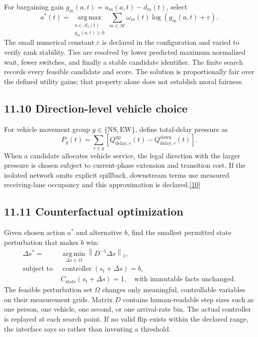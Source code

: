 \documentclass[
  english,
  11pt,
  a4paper,
]{article}
\begin{document}
For bargaining gain \(g_m(a,t)=u_m(a,t)-d_m(t)\), select
\[
  a^*(t)=\operatorname*{arg\,max}_{\substack{
      a\in\mathcal{A}_{\delta}(t)\\ g_m(a,t)\ge0}}
    \sum_{m\in\mathcal{M}}\omega_m(t)
    \log\!\left(g_m(a,t)+\varepsilon\right).
\]
The small numerical constant \(\varepsilon\) is declared in the
configuration and varied to verify rank stability. Ties are resolved by
lower predicted maximum normalized wait, fewer switches, and finally a
stable candidate identifier. The finite search records every feasible
candidate and score. The solution is proportionally fair over the
defined utility gains; that property alone does not establish moral
fairness.

\subsection{11.10 Direction-level vehicle choice}\label{direction-level-vehicle-choice}

For vehicle movement group \(g\in\{\mathrm{NS},\mathrm{EW}\}\), define
total-delay pressure as
\[
  P_g(t)=\sum_{r\in g}
  \left[Q^{\mathrm{up}}_{\mathrm{delay},r}(t)
  -Q^{\mathrm{down}}_{\mathrm{delay},r}(t)\right].
\]
When a candidate allocates vehicle service, the legal direction with
the larger pressure is chosen subject to current-phase extension and
transition cost. If the isolated network omits explicit spillback,
downstream terms use measured receiving-lane occupancy and this
approximation is declared.\hyperref[source-10]{[10]}

\subsection{11.11 Counterfactual optimization}\label{counterfactual-optimization}

Given chosen action \(a^*\) and alternative \(b\), find the smallest
permitted state perturbation that makes \(b\) win:
\begin{align}
  \Delta s^* ={}& \operatorname*{arg\,min}_{\Delta s\in\Omega}
    \left\|D^{-1}\Delta s\right\|_1,\\
  \text{subject to }{}&
    \operatorname{controller}(s_t+\Delta s)=b,\\
  & C_{\mathrm{state}}(s_t+\Delta s)=1,
    \quad\text{with immutable facts unchanged.}
\end{align}
The feasible perturbation set \(\Omega\) changes only meaningful,
controllable variables on their measurement grids. Matrix \(D\)
contains human-readable step sizes such as one person, one vehicle, one
second, or one arrival-rate bin. The actual controller is replayed at
each search point. If no valid flip exists within the declared range,
the interface says so rather than inventing a threshold.
\end{document}
